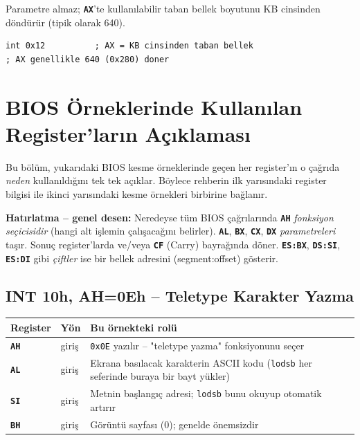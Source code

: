 \documentclass[11pt,a4paper]{article}
\newcommand{\reg}[1]{\texttt{\color{anaMavi}\textbf{#1}}}
\newcommand{\hx}[1]{\texttt{\color{turuncu}#1}}
\newcommand{\kod}[1]{\texttt{\color{koyuGri}#1}}
\begin{document}
Parametre almaz; \reg{AX}'te kullanılabilir taban bellek boyutunu KB cinsinden
döndürür (tipik olarak 640).

\begin{lstlisting}
int 0x12          ; AX = KB cinsinden taban bellek
; AX genellikle 640 (0x280) doner
\end{lstlisting}

\section{BIOS Örneklerinde Kullanılan Register'ların Açıklaması}

Bu bölüm, yukarıdaki BIOS kesme örneklerinde geçen her register'ın o çağrıda
\emph{neden} kullanıldığını tek tek açıklar. Böylece rehberin ilk yarısındaki
register bilgisi ile ikinci yarısındaki kesme örnekleri birbirine bağlanır.

\begin{bilgikutu}
\textbf{Hatırlatma -- genel desen:} Neredeyse tüm BIOS çağrılarında \reg{AH}
\emph{fonksiyon seçicisidir} (hangi alt işlemin çalışacağını belirler).
\reg{AL}, \reg{BX}, \reg{CX}, \reg{DX} \emph{parametreleri} taşır. Sonuç
register'larda ve/veya \reg{CF} (Carry) bayrağında döner. \reg{ES:BX},
\reg{DS:SI}, \reg{ES:DI} gibi \emph{çiftler} ise bir bellek adresini
(segment:offset) gösterir.
\end{bilgikutu}

\subsection{INT 10h, AH=0Eh -- Teletype Karakter Yazma}

\begin{center}
\begin{tabularx}{\textwidth}{@{}l l >{\raggedright\arraybackslash}X@{}}
\toprule
\rowcolor{anaMavi}\color{white}\textbf{Register} & \color{white}\textbf{Yön} & \color{white}\textbf{Bu örnekteki rolü} \\
\midrule
\reg{AH} & giriş & \hx{0x0E} yazılır -- "teletype yazma" fonksiyonunu seçer \\
\rowcolor{acikGri} \reg{AL} & giriş & Ekrana basılacak karakterin ASCII kodu (\kod{lodsb} her seferinde buraya bir bayt yükler) \\
\reg{SI} & giriş & Metnin başlangıç adresi; \kod{lodsb} bunu okuyup otomatik artırır \\
\rowcolor{acikGri} \reg{BH} & giriş & Görüntü sayfası (0); genelde önemsizdir \\
\bottomrule
\end{tabularx}
\end{center}
\end{document}
